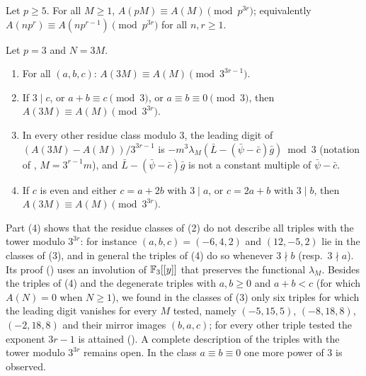\documentclass[11pt]{amsart}
\begin{document}
\begin{theorem}\label{thm:F}
Let $p\ge5$. For all $M\ge1$, $A(pM)\equiv A(M)\pmod{p^{3r}}$; equivalently $A(np^r)\equiv A(np^{r-1})\pmod{p^{3r}}$ for all $n,r\ge1$.
\end{theorem}

\begin{theorem}\label{thm:F3}
Let $p=3$ and $N=3M$.
\begin{enumerate}
\item For all $(a,b,c)$: $A(3M)\equiv A(M)\pmod{3^{3r-1}}$.
\item If $3\mid c$, or $a+b\equiv c\pmod3$, or $a\equiv b\equiv0\pmod3$, then $A(3M)\equiv A(M)\pmod{3^{3r}}$.
\item In every other residue class modulo $3$, the leading digit of $(A(3M)-A(M))/3^{3r-1}$ is $-m^3\lambda_M(\bar L-(\bar\psi-\bar c)\bar g)\bmod3$ (notation of , $M=3^{r-1}m$), and $\bar L-(\bar\psi-\bar c)\bar g$ is not a constant multiple of $\bar\psi-\bar c$.
\item If $c$ is even and either $c=a+2b$ with $3\mid a$, or $c=2a+b$ with $3\mid b$, then $A(3M)\equiv A(M)\pmod{3^{3r}}$.
\end{enumerate}
\end{theorem}
Part (4) shows that the residue classes of (2) do not describe all triples with the tower modulo $3^{3r}$: for instance $(a,b,c)=(-6,4,2)$ and $(12,-5,2)$ lie in the classes of (3), and in general the triples of (4) do so whenever $3\nmid b$ (resp.\ $3\nmid a$). Its proof () uses an involution of $\mathbb{F}_3[[y]]$ that preserves the functional $\lambda_M$. Besides the triples of (4) and the degenerate triples with $a,b\ge0$ and $a+b<c$ (for which $A(N)=0$ when $N\ge1$), we found in the classes of (3) only six triples for which the leading digit vanishes for every $M$ tested, namely $(-5,15,5)$, $(-8,18,8)$, $(-2,18,8)$ and their mirror images $(b,a,c)$; for every other triple tested the exponent $3r-1$ is attained (). A complete description of the triples with the tower modulo $3^{3r}$ remains open. In the class $a\equiv b\equiv0$ one more power of $3$ is observed.
\end{document}

